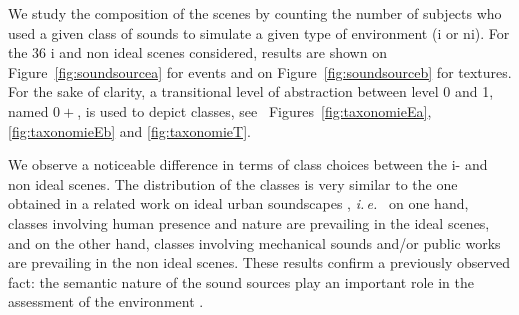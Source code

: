 \documentclass[12pt]{elsarticle}
\newcommand{\ie}{\emph{i.\,e.}}
\newcommand{\cf}{cf.}
\begin{document}

We study the composition of the scenes by counting the number of subjects who used a given class of sounds to simulate a given type of environment (i or ni). For the 36 i and non ideal scenes considered, results are shown on Figure~\ref{fig:soundsourcea} for events and on Figure~\ref{fig:soundsourceb} for textures. For the sake of clarity, a transitional level of abstraction between level 0 and 1, named $0+$, is used to depict classes, see ~Figures~\ref{fig:taxonomieEa}, \ref{fig:taxonomieEb} and \ref{fig:taxonomieT}.


We observe a noticeable difference in terms of class choices between the i- and non ideal scenes. The distribution of the classes is very similar to the one obtained in a related work on ideal urban soundscapes \cite{guastavino2006ideal}, \ie~ on one hand, classes involving human presence and nature are prevailing in the ideal scenes, and on the other hand, classes involving mechanical sounds and/or public works are prevailing in the non ideal scenes. These results confirm a previously observed fact: the semantic nature of the sound sources play an important role in the assessment of the environment \cite{raimbault2005urban,dubois2006cognitive}.

\end{document}
